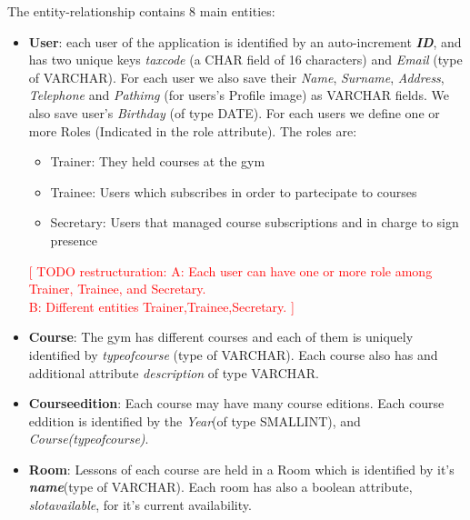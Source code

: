     The entity-relationship contains 8 main entities:
    \begin{itemize}
        \item 
        \textbf{User}: each user of the application is identified by an auto-increment \textit{\textbf{ID}}, and has two unique keys \textit{tax\textunderscore code} (a CHAR field of 16 characters) and \textit{Email} (type of VARCHAR). 
    	For each user we also save their \textit{Name}, \textit{Surname}, \textit{Address}, \textit{Telephone} and \textit{Pathimg} (for users's Profile image) as VARCHAR fields. We also save user's \textit{Birthday} (of type DATE). For each users we define
        one or more Roles (Indicated in the role attribute). The roles are:
        \begin{itemize}
	    \item Trainer: They held courses at the gym 
    	\item Trainee: Users which subscribes in order to partecipate to courses
        \item Secretary: Users that managed course subscriptions and in charge to sign presence
        \end{itemize}
    	\newline 
    	\newline 
    	\textcolor{red}{[ TODO restructuration: A: Each user can have one or more role among Trainer,  Trainee, and Secretary.\\
    	  B: Different entities Trainer,Trainee,Secretary. ]}
    	
    	\item 
    	\textbf{Course}: The gym has different courses and each of them is uniquely identified by 
    	\textit{type\textunderscore of\textunderscore course} (type of VARCHAR). Each course also has and additional attribute \textit{description} of type VARCHAR.
    	
    	\item 
    	\textbf{Course\textunderscore edition}: Each course may have many course editions. Each course eddition is identified by the \textit{Year}(of type SMALLINT), and \textit{Course(type\textunderscore of\textunderscore course)}.
    	
    	\item 
    	\textbf{Room}: Lessons of each course are held in a Room which is identified by it's \textbf{\textit{name}}(type of VARCHAR). Each room has also a boolean attribute, \textit{slot\textunderscore available}, for it's current availability.
    	

\end{itemize}
